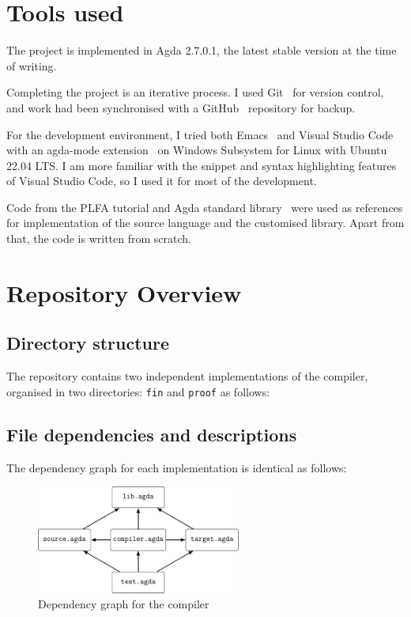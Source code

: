 \documentclass[12pt,a4paper]{report}
\theoremstyle{definition}
\begin{document}
    \section{Tools used} \label{sec: tools}
    The project is implemented in Agda 2.7.0.1, the latest stable version at the time of writing.

    Completing the project is an iterative process. I used Git~\autocite{git} for version control, and work had been synchronised with a GitHub~\autocite{github} repository for backup.

    For the development environment, I tried both Emacs~\autocite{emacs} and Visual Studio Code~\autocite{vscode} with an agda-mode extension~\autocite{agda_mode} on Windows Subsystem for Linux with Ubuntu~\autocite{wsl_ubuntu} 22.04 LTS. I am more familiar with the snippet and syntax highlighting features of Visual Studio Code, so I used it for most of the development. 

    Code from the PLFA tutorial and Agda standard library~\autocite{agda_std} were used as references for implementation of the source language and the customised library. Apart from that, the code is written from scratch.

    \section{Repository Overview} \label{sec: repo_overview}
        \subsection{Directory structure}
        The repository contains two independent implementations of the compiler, organised in two directories: \texttt{fin} and \texttt{proof} as follows:

        \subsection{File dependencies and descriptions}
        The dependency graph for each implementation is identical as follows:
        \begin{figure}[H]
            \centering
            \includegraphics[width=0.6\textwidth]{dependencies.pdf}
            \caption{Dependency graph for the compiler}
            \label{fig: dependencies}
        \end{figure}
\end{document}
